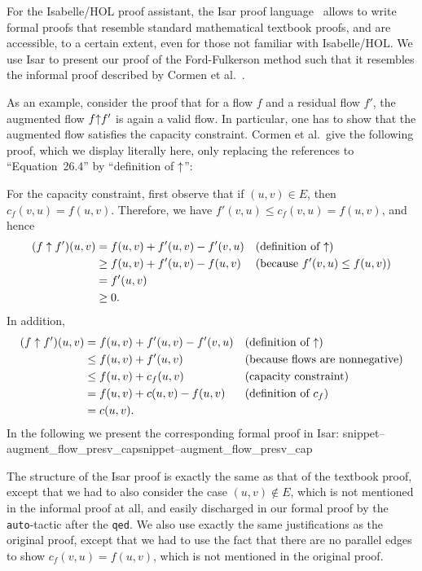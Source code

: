 \documentclass[smallcondensed]{svjour3}     %
\newcommand{\isai}{\lstinline[language=isabelle,basicstyle=\normalsize\ttfamily\slshape]}
\newcommand{\Snippet}[1]{\ifcsname snippet--#1\endcsname\csname snippet--#1\endcsname\else\PackageError{}{No snippet '#1' defined.}{}\fi}
\begin{document}
For the Isabelle/HOL proof assistant, the Isar proof language~\cite{Wenzel99} allows to write formal proofs that resemble standard mathematical textbook proofs, and are accessible, to a certain extent, even for those not familiar with Isabelle/HOL. 
We use Isar to present our proof of the Ford-Fulkerson method such that it resembles the informal proof described by Cormen et al.~\cite{CLRS09}.

As an example, consider the proof that for a flow $f$ and a residual flow $f'$, the augmented flow $f{\mathbin\uparrow} f'$ is again a valid flow. In particular, one has to show 
that the augmented flow satisfies the capacity constraint. Cormen et al.~give the following proof, which we display literally here, only replacing the references to 
``Equation~26.4'' by ``definition of ${\mathbin\uparrow}$'':

For the capacity constraint, first observe that if $(u, v) \in E$, then $c_f(v, u) = f(u, v)$. Therefore, we have $f'(v,u) \leq c_f(v, u) = f(u, v)$, and hence
	\begin{align*}
	(f \uparrow f') (u, v) &= f(u, v) + f'(u, v) - f'(v, u)  && \text{(definition of ${\mathbin\uparrow}$)} \\
	& \geq f(u, v) + f'(u, v) - f(u, v) && \text{(because $f'(v,u) \leq f(u, v)$)} \\
	& = f'(u, v) \\
	& \geq 0.
	\end{align*}
In addition,
	\begin{align*}
	(f \uparrow f') (u, v) &= f(u, v) + f'(u, v) - f'(v, u)  && \text{(definition of ${\mathbin\uparrow}$)} \\
	& \leq f(u, v) + f'(u, v) && \text{(because flows are nonnegative)} \\
	& \leq f(u, v) + c_f(u, v) &&  \text{(capacity constraint)} \\
	& = f(u, v) + c(u, v) - f(u, v) && \text{(definition of $c_f$)} \\
	& = c (u, v).
	\end{align*}
% 
In the following we present the corresponding formal proof in Isar:
\Snippet{augment_flow_presv_cap}
The structure of the Isar proof is exactly the same as that of the textbook proof, except that we had to also consider the case $(u,v)\notin E$, which is not mentioned in the informal proof at all, and easily discharged in our formal proof by the \isai{auto}-tactic after the \isai{qed}. We also use exactly the same justifications as the original proof, except that we had to use the fact that there are no parallel edges to show $c_f(v,u)=f(u,v)$, which is not mentioned in the original proof.
\end{document}

